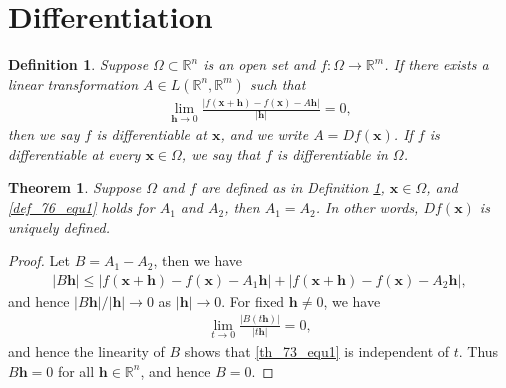\documentclass[10pt]{book}
\newtheorem{definition}{Definition}[chapter]
\newtheorem{theorem}{Theorem}[chapter]
\theoremstyle{definition}
\numberwithin{equation}{chapter}
\begin{document}
\medskip


\section{Differentiation}

\begin{definition}\label{def_76}
Suppose $\Omega \subset \mathbb{R}^n$ is an open set and $f: \Omega \to \mathbb{R}^m$. If there exists a linear transformation $A \in L(\mathbb{R}^n,\mathbb{R}^m)$ such that
\begin{align}\label{def_76_equ1}
    \lim_{\mathbf{h}\to 0} \frac{\left|f(\mathbf{x} + \mathbf{h}) - f(\mathbf{x}) - A\mathbf{h}\right|}{\left|\mathbf{h}\right|} = 0,
\end{align}
then we say $f$ is differentiable at $\mathbf{x}$, and we write $A = Df(\mathbf{x})$. If $f$ is differentiable at every $\mathbf{x} \in \Omega$, we say that $f$ is differentiable in $\Omega$.
\end{definition}

\medskip

\begin{theorem}\label{th_73}
Suppose $\Omega$ and $f$ are defined as in Definition \ref{def_76}, $\mathbf{x} \in \Omega$, and \eqref{def_76_equ1} holds for $A_1$ and $A_2$, then $A_1 = A_2$. In other words, $Df(\mathbf{x})$ is uniquely defined.
\end{theorem}
\begin{proof}
Let $B = A_1 - A_2$, then we have
\begin{align*}
    \left|B\mathbf{h}\right| \leq \left|f(\mathbf{x} + \mathbf{h}) - f(\mathbf{x}) - A_1 \mathbf{h}\right| + \left|f(\mathbf{x} + \mathbf{h}) - f(\mathbf{x}) - A_2 \mathbf{h}\right|,
\end{align*}
and hence $\left|B\mathbf{h}\right|/\left|\mathbf{h}\right| \to 0$ as $\left|\mathbf{h}\right| \to 0$. For fixed $\mathbf{h} \neq 0$, we have
\begin{align}\label{th_73_equ1}
    \lim_{t\to 0} \frac{\left|B(t\mathbf{h}) \right|}{\left|t\mathbf{h} \right|} = 0,
\end{align}
and hence the linearity of $B$ shows that \eqref{th_73_equ1} is independent of $t$. Thus $B\mathbf{h} = 0$ for all $\mathbf{h} \in \mathbb{R}^n$, and hence $B = 0$.
\end{proof}

\medskip
\end{document}
